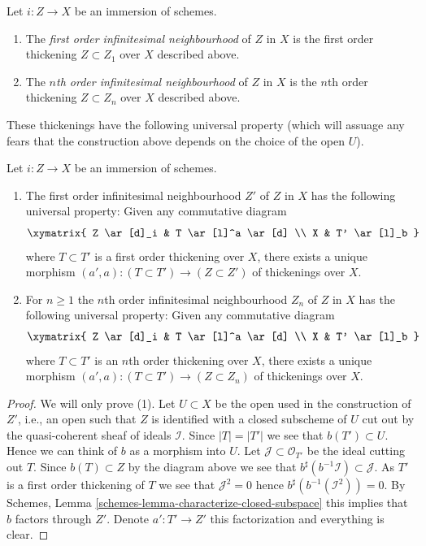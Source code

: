 \begin{definition}
\label{definition-first-order-infinitesimal-neighbourhood}
Let $i : Z \to X$ be an immersion of schemes.
\begin{enumerate}
\item The {\it first order infinitesimal neighbourhood} of $Z$ in $X$ is
the first order thickening $Z \subset Z_1$ over $X$ described above.
\item The {\it $n$th order infinitesimal neighbourhood} of $Z$ in $X$ is
the $n$th order thickening $Z \subset Z_n$ over $X$ described above.
\end{enumerate}
\end{definition}

\noindent
These thickenings have the following universal property (which will assuage
any fears that the construction above depends on the choice of the open
$U$).

\begin{lemma}
\label{lemma-first-order-infinitesimal-neighbourhood}
Let $i : Z \to X$ be an immersion of schemes.
\begin{enumerate}
\item The first order infinitesimal neighbourhood $Z'$ of $Z$ in $X$
has the following universal property: Given any commutative diagram
$$
\xymatrix{
Z \ar[d]_i & T \ar[l]^a \ar[d] \\
X & T' \ar[l]_b
}
$$
where $T \subset T'$ is a first order thickening over $X$, there exists
a unique morphism $(a', a) : (T \subset T') \to (Z \subset Z')$ of
thickenings over $X$.
\item For $n \geq 1$ the $n$th order infinitesimal neighbourhood $Z_n$
of $Z$ in $X$ has the following universal property: Given any commutative
diagram
$$
\xymatrix{
Z \ar[d]_i & T \ar[l]^a \ar[d] \\
X & T' \ar[l]_b
}
$$
where $T \subset T'$ is an $n$th order thickening over $X$, there exists
a unique morphism $(a', a) : (T \subset T') \to (Z \subset Z_n)$ of
thickenings over $X$.
\end{enumerate}
\end{lemma}

\begin{proof}
We will only prove (1).
Let $U \subset X$ be the open used in the construction of $Z'$, i.e., an
open such that $Z$ is identified with a closed subscheme of $U$ cut out by
the quasi-coherent sheaf of ideals $\mathcal{I}$.
Since $|T| = |T'|$ we see that $b(T') \subset U$. Hence we can
think of $b$ as a morphism into $U$. Let $\mathcal{J} \subset \mathcal{O}_{T'}$
be the ideal cutting out $T$. Since $b(T) \subset Z$ by the diagram above
we see that $b^\sharp(b^{-1}\mathcal{I}) \subset \mathcal{J}$. As
$T'$ is a first order thickening of $T$ we see that $\mathcal{J}^2 = 0$
hence $b^\sharp(b^{-1}(\mathcal{I}^2)) = 0$. By
Schemes, Lemma \ref{schemes-lemma-characterize-closed-subspace}
this implies that $b$ factors through $Z'$. Denote $a' : T' \to Z'$
this factorization and everything is clear.
\end{proof}


